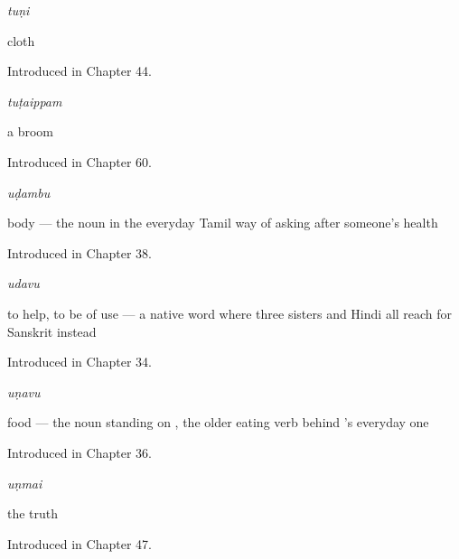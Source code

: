 \noindent\begin{minipage}[t]{\linewidth}
\raggedright
\textbf{}\enspace\emph{tuṇi}\par
\small cloth\par
\footnotesize Introduced in Chapter 44.
\end{minipage}\par\medskip

\noindent\begin{minipage}[t]{\linewidth}
\raggedright
\textbf{}\enspace\emph{tuṭaippam}\par
\small a broom\par
\footnotesize Introduced in Chapter 60.
\end{minipage}\par\medskip

\noindent\begin{minipage}[t]{\linewidth}
\raggedright
\textbf{}\enspace\emph{uḍambu}\par
\small body — the noun in the everyday Tamil way of asking after someone's health\par
\footnotesize Introduced in Chapter 38.
\end{minipage}\par\medskip

\noindent\begin{minipage}[t]{\linewidth}
\raggedright
\textbf{}\enspace\emph{udavu}\par
\small to help, to be of use — a native word where three sisters and Hindi all reach for Sanskrit instead\par
\footnotesize Introduced in Chapter 34.
\end{minipage}\par\medskip

\noindent\begin{minipage}[t]{\linewidth}
\raggedright
\textbf{}\enspace\emph{uṇavu}\par
\small food — the noun standing on , the older eating verb behind 's everyday one\par
\footnotesize Introduced in Chapter 36.
\end{minipage}\par\medskip

\noindent\begin{minipage}[t]{\linewidth}
\raggedright
\textbf{}\enspace\emph{uṇmai}\par
\small the truth\par
\footnotesize Introduced in Chapter 47.
\end{minipage}\par\medskip

